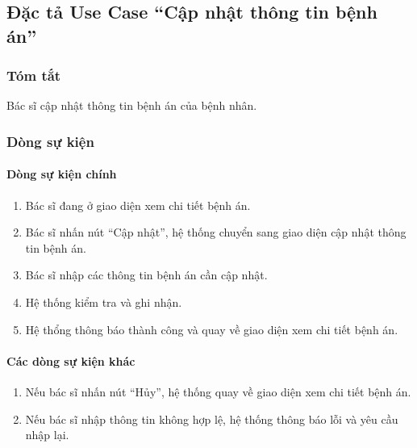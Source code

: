 \subsection{Đặc tả Use Case ``Cập nhật thông tin bệnh án''}

\subsubsection{Tóm tắt}
Bác sĩ cập nhật thông tin bệnh án của bệnh nhân.

\subsubsection{Dòng sự kiện}
\paragraph{\textbf{Dòng sự kiện chính}}
\begin{enumerate}
    \item Bác sĩ đang ở giao diện xem chi tiết bệnh án.
    \item Bác sĩ nhấn nút ``Cập nhật'', hệ thống chuyển sang giao diện cập nhật thông tin bệnh án.
    \item Bác sĩ nhập các thông tin bệnh án cần cập nhật.
    \item Hệ thống kiểm tra và ghi nhận.
    \item Hệ thổng thông báo thành công và quay về giao diện xem chi tiết bệnh án.
\end{enumerate}

\paragraph{\textbf{Các dòng sự kiện khác}}
\begin{enumerate}
    \item Nếu bác sĩ nhấn nút ``Hủy'', hệ thống quay về giao diện xem chi tiết bệnh án.
    \item Nếu bác sĩ nhập thông tin không hợp lệ, hệ thống thông báo lỗi và yêu cầu nhập lại.
\end{enumerate}

